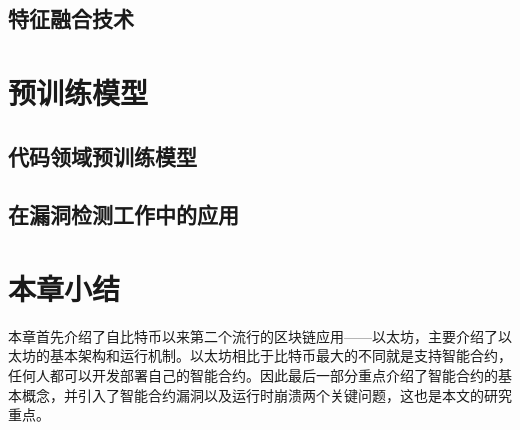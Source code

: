 \subsection{特征融合技术}
\section{预训练模型}
\subsection{代码领域预训练模型}
\subsection{在漏洞检测工作中的应用}
\section{本章小结}
\label{sec:本章小结2}
本章首先介绍了自比特币以来第二个流行的区块链应用——以太坊，主要介绍了以太坊的基本架构和运行机制。以太坊相比于比特币最大的不同就是支持智能合约，任何人都可以开发部署自己的智能合约。因此最后一部分重点介绍了智能合约的基本概念，并引入了智能合约漏洞以及运行时崩溃两个关键问题，这也是本文的研究重点。